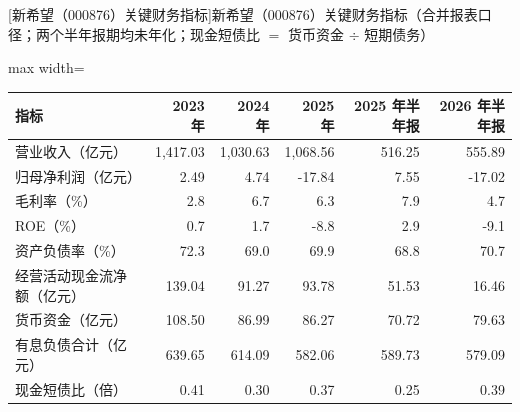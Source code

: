 \begin{center}\small\setlength{\tabcolsep}{3.4pt}
[新希望（000876）关键财务指标]{新希望（000876）关键财务指标（合并报表口径；两个半年报期均未年化；现金短债比 $=$ 货币资金 $\div$ 短期债务）}
\begin{adjustbox}{max width=\textwidth}
\begin{tabular}{@{}lrrrrr@{}}
\toprule
指标 & 2023 年 & 2024 年 & 2025 年 & 2025 年半年报 & 2026 年半年报 \\
\midrule
营业收入（亿元） & 1,417.03 & 1,030.63 & 1,068.56 & 516.25 & 555.89 \\
归母净利润（亿元） & 2.49 & 4.74 & -17.84 & 7.55 & -17.02 \\
毛利率（\%） & 2.8 & 6.7 & 6.3 & 7.9 & 4.7 \\
ROE（\%） & 0.7 & 1.7 & -8.8 & 2.9 & -9.1 \\
资产负债率（\%） & 72.3 & 69.0 & 69.9 & 68.8 & 70.7 \\
经营活动现金流净额（亿元） & 139.04 & 91.27 & 93.78 & 51.53 & 16.46 \\
货币资金（亿元） & 108.50 & 86.99 & 86.27 & 70.72 & 79.63 \\
有息负债合计（亿元） & 639.65 & 614.09 & 582.06 & 589.73 & 579.09 \\
现金短债比（倍） & 0.41 & 0.30 & 0.37 & 0.25 & 0.39 \\
\bottomrule
\end{tabular}
\end{adjustbox}
\end{center}

